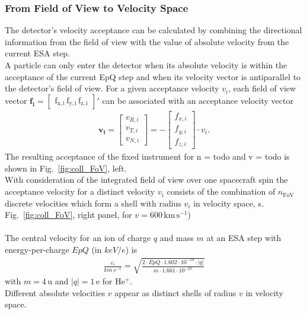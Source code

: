 \subsubsection{From Field of View to Velocity Space}
The detector's velocity acceptance can be calculated by combining the directional information from the field of view with the value of absolute velocity from the current ESA step. 
\\
A particle can only enter the detector when its absolute velocity is within the acceptance of the current EpQ step and when its velocity vector is antiparallel to the detector's field of view. For a given acceptance velocity $v_i$, each field of view vector $\mathrm{\mathbf{f_i} = \begin{bmatrix}f_{x,i}\,f_{y,i}\,f_{z,i}\end{bmatrix}}'$ can be associated with an acceptance velocity vector
\begin{align}
\mathbf{v_i} = \begin{bmatrix}v_{R,i}\\v_{T,i}\\v_{N,i}\end{bmatrix} = - \begin{bmatrix}f_{x,i}\\f_{y,i}\\f_{z,i}\end{bmatrix} \cdot v_i.
\label{eq:fov}
\end{align}
The resulting acceptance of the fixed instrument for n = todo and v = todo is shown in Fig.~\ref{fig:coll_FoV}, left. \\
With consideration of the integrated field of view over one spacecraft spin the acceptance velocity for a distinct velocity $v_i$ consists of the combination of $n_\mathrm{FoV}$ discrete velocities which form a shell with radius $v_i$ in velocity space, s. Fig.~\ref{fig:coll_FoV}, right panel, for $v = 600\,\mathrm{km\,s^{-1}}$)
\\ \\
The central velocity for an ion of charge $q$ and mass $m$ at an ESA step with energy-per-charge $EpQ$ (in $keV/e$) is
\begin{align*}
\frac{v_c}{km \, s^{-1}} = \sqrt{\frac{2 \cdot EpQ \cdot 1.602\cdot10^{-19}\cdot |q|}{m \cdot 1.661 \cdot 10^{-27}} }
\end{align*}
with $m = 4\,\mathrm{u}$ and $|q| = 1\,\mathrm{e}$ for $\mathrm{He^{+}}$.
\\
Different absolute velocities $v$ appear as distinct shells of radius $v$ in velocity space.
